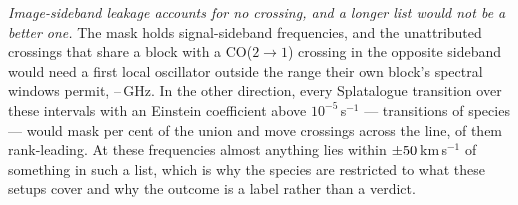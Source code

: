 \emph{Image-sideband leakage accounts for no crossing, and a longer list
would not be a better one.} The mask holds signal-sideband frequencies, and
the \MkImgN{} unattributed crossings that share a block with a CO($2\to1$)
crossing in the opposite sideband would need a first local oscillator outside
the range their own block's spectral windows permit,
\MkImgLOLo--\MkImgLOHi\,GHz. In the other direction, every Splatalogue
transition over these intervals with an Einstein coefficient above
$10^{-5}$\,s$^{-1}$ --- \MaskDbTrans{} transitions of \MaskDbCarriers{}
species --- would mask \MaskDbPctUnion{} per cent of the union and move
\FrFullNFlip{} crossings across the line, \FrFullNFlipRankWord{} of them
rank-leading. At these frequencies almost anything lies within
$\pm50$\,km\,s$^{-1}$ of something in such a list, which is why the
species are restricted to what these setups cover and why the outcome is a
label rather than a verdict.
